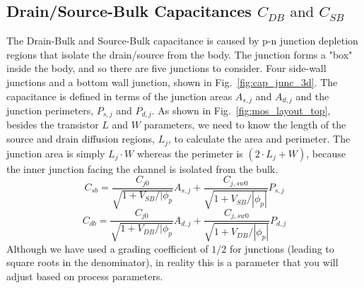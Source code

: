 \subsection{Drain/Source-Bulk Capacitances \texorpdfstring{$C_{DB}\text{ and }C_{SB}$}{}}
The Drain-Bulk and Source-Bulk capacitance is caused by p-n junction depletion regions that isolate the drain/source from the body. The junction forms a "box" inside the body, and so there are five junctions to consider. Four side-wall junctions and a bottom wall junction, shown in Fig.~\ref{fig:cap_junc_3d}.  The capacitance is defined in terms of the junction areas $A_{s,j}$ and $A_{d,j}$ and the junction perimeters, $P_{s,j}$ and $P_{d,j}$.  As shown in  Fig.~\ref{fig:mos_layout_top}, besides the transistor $L$ and $W$ parameters, we need to know the length of the source and drain diffusion regions, $L_j$, to calculate the area and perimeter.  The junction area is simply $L_j \cdot W$ whereas the perimeter is $(2\cdot L_j + W)$, because the inner junction facing the channel is isolated from the bulk.
    \begin{equation}
        C_{sb} = \frac{C_{j0}}{\sqrt{ 1 + V_{SB}/|\phi_{p}}}  A_{s,j} + \frac{C_{j,sw0}}{\sqrt{ 1 + V_{SB}/|\phi_p|}} P_{s,j}
    \end{equation}
    \begin{equation}
        C_{db} = \frac{C_{j0}}{\sqrt{ 1 + V_{DB}/|\phi_{p}}}  A_{d,j} + \frac{C_{j,sw0}}{\sqrt{ 1 + V_{DB}/|\phi_p|}} P_{d,j}
    \end{equation}
Although we have used a grading coefficient of $1/2$ for junctions (leading to square roots in the denominator), in reality this is a parameter that you will adjust based on process parameters.
